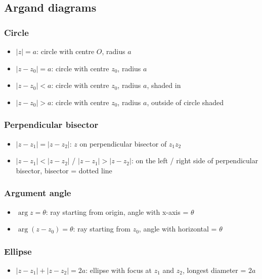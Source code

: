 \subsection{Argand diagrams}
\subsubsection{Circle}
\begin{itemize}
	\item $|z| = a$: circle with centre $O$, radius $a$
	\item $|z-z_0|=a$: circle with centre $z_0$, radius $a$
	\item $|z-z_0|<a$: circle with centre $z_0$, radius $a$, shaded in
	\item $|z-z_0|>a$: circle with centre $z_0$, radius $a$, outside of circle shaded
\end{itemize}
\subsubsection{Perpendicular bisector}
\begin{itemize}
	\item $|z-z_1|=|z-z_2|$: $z$ on perpendicular bisector of $z_1z_2$
	\item $|z-z_1|<|z-z_2|$ / $|z-z_1|>|z-z_2|$: on the left / right side of perpendicular bisector, bisector = dotted line
\end{itemize}
\subsubsection{Argument angle}
\begin{itemize}
	\item $\arg z = \theta$: ray starting from origin, angle with x-axis = $\theta$
	\item $\arg (z-z_0) = \theta$: ray starting from $z_0$, angle with horizontal = $\theta$
\end{itemize}
\subsubsection{Ellipse}
\begin{itemize}
	\item $|z-z_1|+|z-z_2|=2a$: ellipse with focus at $z_1$ and $z_2$, longest diameter = $2a$
\end{itemize}



